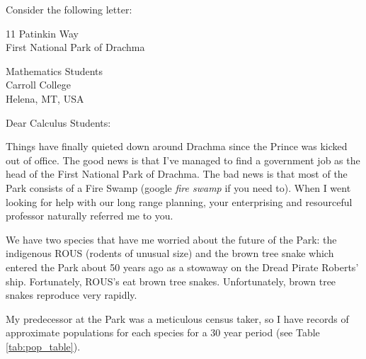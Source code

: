 \begin{lab}
   Consider the following letter:
\begin{flushright}
    11 Patinkin Way \\
    First National Park of Drachma \\
\end{flushright}
\begin{flushleft}
    Mathematics Students \\
    Carroll College \\
    Helena, MT, USA
\end{flushleft}

\noindent Dear Calculus Students:

Things have finally quieted down around Drachma since the Prince was kicked out of office.
The good news is that I've managed to find a government job as the head of the First
National Park of Drachma.  The bad news is that most of the Park consists of a Fire Swamp
(google {\it fire swamp} if you need to).  When I went looking for help with our long
range planning, your enterprising and resourceful professor naturally referred me to you.

We have two species that have me worried about the future of the Park: the indigenous ROUS
(rodents of unusual size) and the brown tree snake which entered the Park about 50 years
ago as a stowaway on the Dread Pirate Roberts' ship.  Fortunately, ROUS's eat brown tree snakes.
Unfortunately, brown tree snakes reproduce very rapidly.

My predecessor at the Park was a meticulous census taker, so I have records of approximate
populations for each species for a 30 year period (see Table \ref{tab:pop_table}).


\end{lab}
